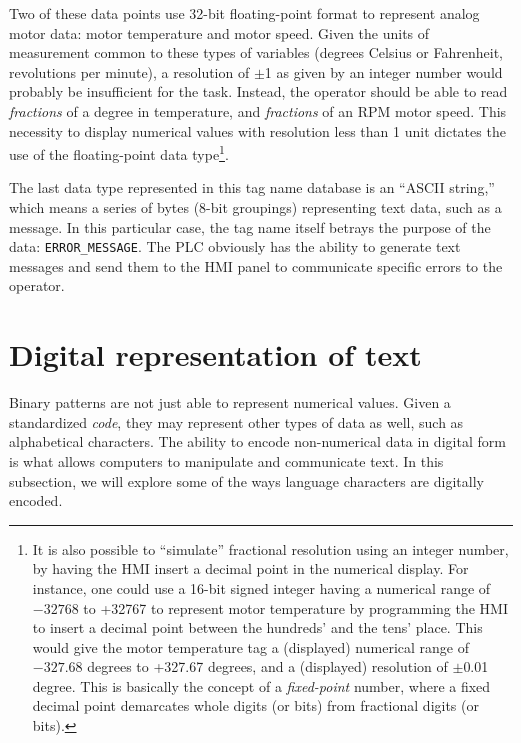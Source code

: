 Two of these data points use 32-bit floating-point format to represent analog motor data: motor temperature and motor speed.  Given the units of measurement common to these types of variables (degrees Celsius or Fahrenheit, revolutions per minute), a resolution of $\pm$1 as given by an integer number would probably be insufficient for the task.  Instead, the operator should be able to read \textit{fractions} of a degree in temperature, and \textit{fractions} of an RPM motor speed.  This necessity to display numerical values with resolution less than 1 unit dictates the use of the floating-point data type\footnote{It is also possible to ``simulate'' fractional resolution using an integer number, by having the HMI insert a decimal point in the numerical display.  For instance, one could use a 16-bit signed integer having a numerical range of $-32768$ to +32767 to represent motor temperature by programming the HMI to insert a decimal point between the hundreds' and the tens' place.  This would give the motor temperature tag a (displayed) numerical range of $-327.68$ degrees to +327.67 degrees, and a (displayed) resolution of $\pm$0.01 degree.  This is basically the concept of a \textit{fixed-point} number, where a fixed decimal point demarcates whole digits (or bits) from fractional digits (or bits).}.   

The last data type represented in this tag name database is an ``ASCII string,'' which means a series of bytes (8-bit groupings) representing text data, such as a message.  In this particular case, the tag name itself betrays the purpose of the data: \texttt{ERROR\_MESSAGE}.  The PLC obviously has the ability to generate text messages and send them to the HMI panel to communicate specific errors to the operator.  









\filbreak
\section{Digital representation of text}

Binary patterns are not just able to represent numerical values.  Given a standardized \textit{code}, they may represent other types of data as well, such as alphabetical characters.  The ability to encode non-numerical data in digital form is what allows computers to manipulate and communicate text.  In this subsection, we will explore some of the ways language characters are digitally encoded.


